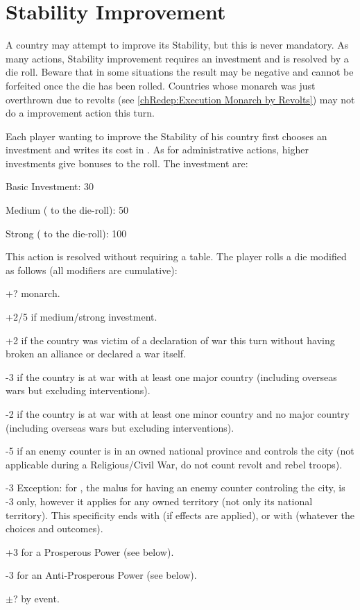 \section{Stability Improvement}\label{chBudget:Stability Improvement}
\aparag[Stability] A country may attempt to improve its Stability, but this is
never mandatory. As many actions, Stability improvement requires an investment
and is resolved by a die roll. Beware that in some situations the result may
be negative and cannot be forfeited once the die has been rolled.
\bparag Countries whose monarch was just overthrown due to revolts (see
\ref{chRedep:Execution Monarch by Revolts}) may not do a \STAB improvement
action this turn.

\aparag[Investment] Each player wanting to improve the Stability of his
country first chooses an investment and writes its cost in
. As for administrative actions, higher
investments give bonuses to the roll.
\bparag The investment are:
\begin{modlist}
  \item Basic Investment: 30 \ducats
  \item Medium ( to the die-roll): 50 \ducats
  \item Strong ( to the die-roll): 100 \ducats
\end{modlist}

\aparag[Procedure]
This action is resolved without requiring a table.  The player rolls a die
modified as follows (all modifiers are cumulative):
\begin{modlist}
  \item[+?] \ADM monarch.
  \item[+2/5] if medium/strong investment.
  \item[+2] if the country was victim of a declaration of war this turn
    without having broken an alliance or declared a war itself.
  \item[-3] if the country is at war with at least one major country
    (including overseas wars but excluding interventions).
  \item[-2] if the country is at war with at least one minor country and no
    major country (including overseas wars but excluding interventions).
  \item[-5] if an enemy \ARMY counter is in an owned national province and
    controls the city (not applicable during a Religious/Civil War, do not
    count revolt and rebel troops).
  \item[-3] Exception: for \SPA, the malus for having an enemy \ARMY counter
    controling the city, is -3 only, however it applies for any owned
    territory (not only its national territory). This specificity ends with
     (if effects are applied), or with
     (whatever the choices and outcomes).
  \item[+3] for a Prosperous Power (see below).
  \item[-3] for an Anti-Prosperous Power (see below).
  \item[$\pm$?] by event.
\end{modlist}

